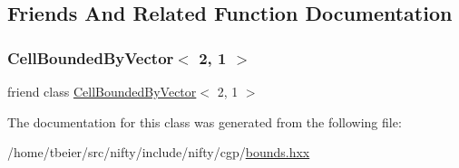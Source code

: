 \subsection{Friends And Related Function Documentation}
\mbox{\label{classnifty_1_1cgp_1_1CellBoundedBy_3_012_00_011_01_4_abdb37afb9b659d234727be05e2560e42}} 
\subsubsection{\texorpdfstring{Cell\+Bounded\+By\+Vector$<$ 2, 1 $>$}{CellBoundedByVector< 2, 1 >}}
{\footnotesize\ttfamily friend class \hyperlink{classnifty_1_1cgp_1_1CellBoundedByVector}{Cell\+Bounded\+By\+Vector}$<$ 2, 1 $>$\hspace{0.3cm}{\ttfamily [friend]}}



The documentation for this class was generated from the following file\+:\begin{DoxyCompactItemize}
\item 
/home/tbeier/src/nifty/include/nifty/cgp/\hyperlink{bounds_8hxx}{bounds.\+hxx}\end{DoxyCompactItemize}
